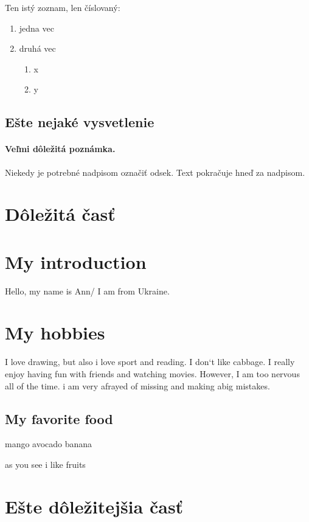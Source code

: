 \documentclass[10pt,twoside,english,a4paper]{article}
\begin{document}
Ten istý zoznam, len číslovaný:

\begin{enumerate}
\item jedna vec
\item druhá vec
	\begin{enumerate}
	\item x
	\item y
	\end{enumerate}
\end{enumerate}


\subsection{Ešte nejaké vysvetlenie} \label{ina:este}

\paragraph{Veľmi dôležitá poznámka.}
Niekedy je potrebné nadpisom označiť odsek. Text pokračuje hneď za nadpisom.



\section{Dôležitá časť} \label{dolezita}


\section*{My introduction}
Hello, my name is Ann/ I am from Ukraine.
\section*{My hobbies}




I love drawing, but also i love sport and reading.
I don`t like cabbage. I  really enjoy having fun with friends and watching movies. However, I am too nervous all of the time. i am very afrayed of missing and making  abig mistakes.
\subsection{My favorite food}
mango
avocado
banana

as you see i like fruits
\section{Ešte dôležitejšia časť} \label{dolezitejsia}
\end{document}
